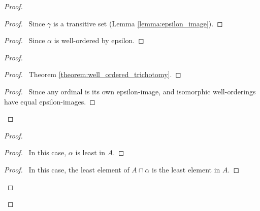 \documentclass{report}
\let\qed\relax
\theoremstyle{definition}
\begin{document}
    \begin{proof}
        \pf
        \begin{proof}
            \pf\ Since $\gamma$ is a transitive set (Lemma \ref{lemma:epsilon_image}).
        \end{proof}
        \begin{proof}
            \pf\ Since $\alpha$ is well-ordered by epsilon.
        \end{proof}
        \begin{proof}
            \begin{proof}
                \pf\ Theorem \ref{theorem:well_ordered_trichotomy}.
            \end{proof}
            \begin{proof}
                \pf\ Since any ordinal is its own epsilon-image, and isomorphic well-orderings have equal
                epsilon-images.
            \end{proof}
        \end{proof}
        \begin{proof}
            \begin{proof}
                \pf\ In this case, $\alpha$ is least in $A$.
            \end{proof}
            \begin{proof}
                \pf\ In this case, the least element of $A \cap \alpha$ is the least element in $A$.
            \end{proof}
        \end{proof}
        \qed
    \end{proof}
\end{document}
